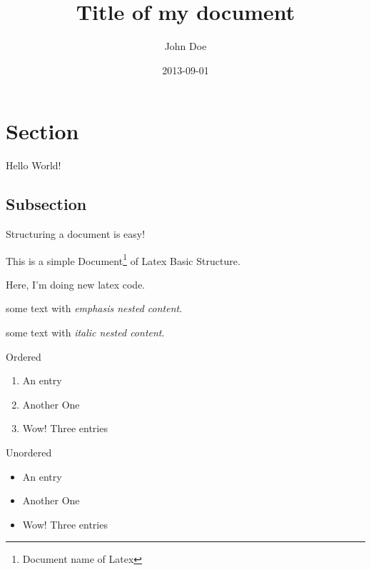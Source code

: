 \documentclass{article}
\title{Title of my document}
\date{2013-09-01}
\author{John Doe}
\begin{document}
\maketitle
{}

\newpage


\section{Section}
Hello World!

\subsection{Subsection}
Structuring a document is easy!

\newpage 


This is a simple Document\footnote{Document name of Latex} of Latex Basic Structure.

Here, I'm doing new latex code.

\newpage

some text with \emph{emphasis \emph{nested} content}.


some text with \textit{italic \textit{nested} content}.


\newpage


Ordered
\begin{enumerate}
  \item An entry
  \item Another One
  \item Wow! Three entries
\end{enumerate}

Unordered
\begin{itemize}
  \item An entry
  \item Another One
  \item Wow! Three entries
\end{itemize}

\end{document}
